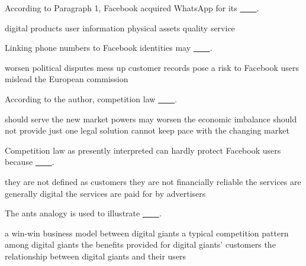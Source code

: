 \item According to Paragraph 1, Facebook acquired WhatsApp for its \uline{~~~~}.
\begin{tasks}
	\task digital products
	\task user information
	\task physical assets
	\task quality service
\end{tasks}
\item Linking phone numbers to Facebook identities may \uline{~~~~}.
\begin{tasks}
	\task worsen political disputes
	\task mess up customer records
	\task pose a risk to Facebook users
	\task mislead the European commission
\end{tasks}
\item According to the author, competition law \uline{~~~~}.
\begin{tasks}
	\task should serve the new market powers
	\task may worsen the economic imbalance
	\task should not provide just one legal solution
	\task cannot keep pace with the changing market
\end{tasks}
\item Competition law as presently interpreted can hardly protect Facebook users because \uline{~~~~}.
\begin{tasks}
	\task they are not defined as customers
	\task they are not financially reliable
	\task the services are generally digital
	\task the services are paid for by advertisers
\end{tasks}
\item The ants analogy is used to illustrate \uline{~~~~}.
\begin{tasks}
	\task a win-win business model between digital giants
	\task a typical competition pattern among digital giants
	\task the benefits provided for digital giants' customers
	\task the relationship between digital giants and their users
\end{tasks}